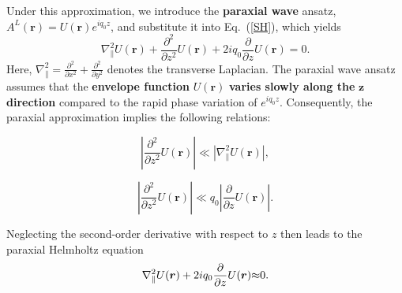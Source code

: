Under this approximation, we introduce the \textbf{paraxial wave} ansatz, $A^L(\boldsymbol{r}) = U(\boldsymbol{r}) e^{iq_0 z}$, and substitute it into Eq.~(\ref{SH}), which yields 
\begin{equation}
\nabla^2_\parallel U(\boldsymbol{r})
+ \frac{\partial^2}{\partial z^2} U(\boldsymbol{r})
+ 2 i q_0 \frac{\partial}{\partial z} U(\boldsymbol{r}) = 0.
\label{parahelm}
\end{equation}
Here, $\nabla^2_\parallel = \frac{\partial^2}{\partial x^2} + \frac{\partial^2}{\partial y^2}$ denotes the transverse Laplacian. The paraxial wave ansatz assumes that the \textbf{envelope function} $U(\boldsymbol{r})$ \textbf{varies slowly along the} $\boldsymbol{z}$ \textbf{direction} compared to the rapid phase variation of $e^{i q_0 z}$. Consequently, the paraxial approximation implies the following relations:

\begin{minipage}{0.48\textwidth}
    \begin{equation}
    \left| \frac{\partial^2}{\partial z^2} U(\boldsymbol{r}) \right|
    \ll
    \left| \nabla^2_\parallel U(\boldsymbol{r}) \right|,
    \label{paraxial1}
    \end{equation}
\end{minipage}
\hfill %
\begin{minipage}{0.48\textwidth}
    \begin{equation}
    \left| \frac{\partial^2}{\partial z^2} U(\boldsymbol{r}) \right|
    \ll
    q_0 \left| \frac{\partial}{\partial z} U(\boldsymbol{r}) \right|.
    \label{paraxial2}
    \end{equation}
\end{minipage}
\vspace{1.75\baselineskip} %
Neglecting the second-order derivative with respect to $z$ then leads to the paraxial Helmholtz equation
\begin{equation}
\nabla^2_\parallel U(\boldsymbol{r}) + 2 i q_0 \frac{\partial}{\partial z} U(\boldsymbol{r}) \color{G}{ \approx} 0.
\label{PHE}
\end{equation}

